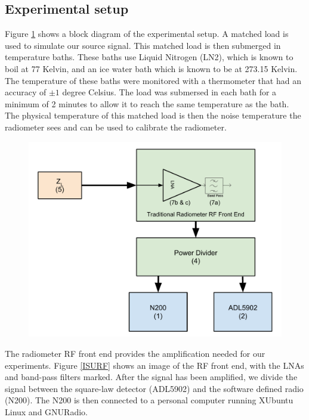 \subsection{Experimental setup} \label{exp1_setup}

Figure \ref{Exp1_Block} shows a block diagram of the experimental setup.  A matched load is used to simulate our source signal.  This matched load is then submerged in temperature baths.  These baths use Liquid Nitrogen (LN2), which is known to boil at 77 Kelvin, and an ice water bath which is known to be at 273.15 Kelvin.  The temperature of these baths were monitored with a thermometer that had an accuracy of $\pm 1$ degree Celsius.  The load was submersed in each bath for a minimum of 2 minutes to allow it to reach the same temperature as the bath.  The physical temperature of this matched load is then the noise temperature the radiometer sees and can be used to calibrate the radiometer.  

{\begin{figure}[h!tb] \centering
\includegraphics[width=13cm]{Images/Exp_1_Setup.pdf}
\label{Exp1_Block}
\end{figure}
}

The radiometer RF front end provides the amplification needed for our experiments.  Figure \ref{ISURF} shows an image of the RF front end, with the LNAs and band-pass filters marked.  After the signal has been amplified, we divide the signal between the square-law detector (ADL5902) and the software defined radio (N200).  The N200 is then connected to a personal computer running XUbuntu Linux and GNURadio.


